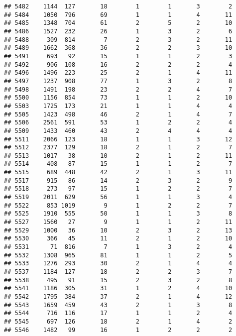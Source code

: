 \documentclass[]{article}
\begin{document}
\begin{verbatim}
## 5482    1144  127       18        1        1       3        2
## 5484    1050  796       69        1        1       4       11
## 5485    1348  704       61        2        5       2       10
## 5486    1527  232       26        1        3       2        6
## 5488     309  814        7        2        3       2       11
## 5489    1662  368       36        2        2       3       10
## 5491     693   92       15        1        1       2        3
## 5492     906  108       16        2        2       2        4
## 5496    1496  223       25        2        1       4       11
## 5497    1237  908       77        1        3       2        8
## 5498    1491  198       23        2        2       4        7
## 5500    1156  854       73        1        1       2       10
## 5503    1725  173       21        1        1       4        4
## 5505    1423  498       46        2        1       4        7
## 5506    2561  591       53        1        2       2        4
## 5509    1433  460       43        2        4       4        4
## 5511    2066  123       18        1        1       3       12
## 5512    2377  129       18        2        1       2        7
## 5513    1017   38       10        2        1       2       11
## 5514     408   87       15        1        1       2        7
## 5515     689  448       42        2        1       3       11
## 5517     915   86       14        2        3       2        9
## 5518     273   97       15        1        2       2        7
## 5519    2011  629       56        1        1       3        4
## 5522     853 1019        9        1        2       2        7
## 5525    1910  555       50        1        1       3        8
## 5527    1560   27        9        1        1       2       11
## 5529    1000   36       10        2        3       2       13
## 5530     366   45       11        2        1       2       10
## 5531      71  816        7        1        3       2        4
## 5532    1308  965       81        1        1       2        5
## 5533    1276  293       30        2        1       4        4
## 5537    1184  127       18        2        2       3        7
## 5538     495   91       15        2        3       2        8
## 5541    1186  305       31        1        2       4       10
## 5542    1795  384       37        2        1       4       12
## 5543    1659  459       43        2        1       3        8
## 5544     716  116       17        1        1       2        4
## 5545     697  126       18        2        1       4        2
## 5546    1482   99       16        1        2       2        2

\end{verbatim}
\end{document}
